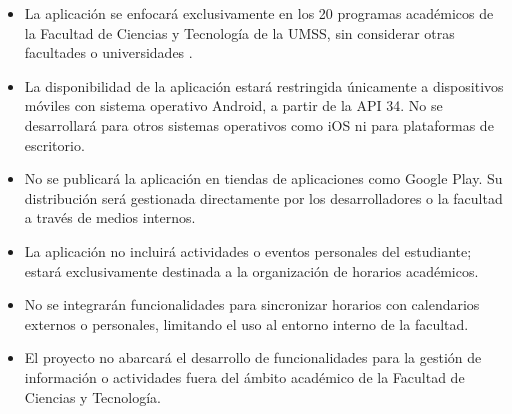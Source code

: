 \begin{itemize}
    \item La aplicación se enfocará exclusivamente en los 20 programas académicos de la Facultad de Ciencias y Tecnología de la UMSS, sin considerar otras facultades o universidades \cite{fcyt_umss}.
    \item La disponibilidad de la aplicación estará restringida únicamente a dispositivos móviles con sistema operativo Android, a partir de la API 34. No se desarrollará para otros sistemas operativos como iOS ni para plataformas de escritorio.
    \item No se publicará la aplicación en tiendas de aplicaciones como Google Play. Su distribución será gestionada directamente por los desarrolladores o la facultad a través de medios internos.
    \item La aplicación no incluirá actividades o eventos personales del estudiante; estará exclusivamente destinada a la organización de horarios académicos.
    \item No se integrarán funcionalidades para sincronizar horarios con calendarios externos o personales, limitando el uso al entorno interno de la facultad.
    \item El proyecto no abarcará el desarrollo de funcionalidades para la gestión de información o actividades fuera del ámbito académico de la Facultad de Ciencias y Tecnología.
\end{itemize}